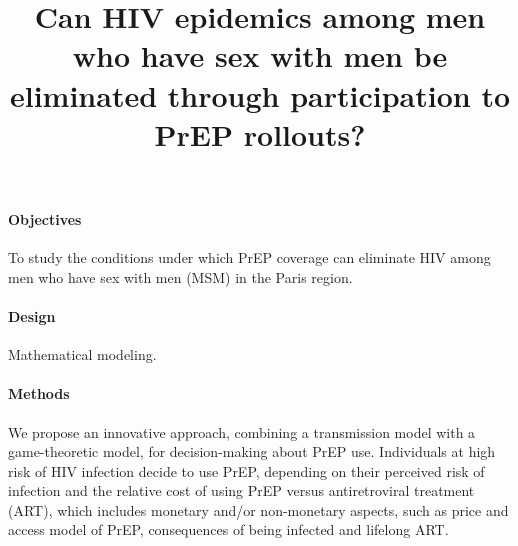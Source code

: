 \documentclass[preprint,review,12pt]{article}			%
\begin{document}

\title{Can HIV epidemics among men who have sex with men be eliminated through participation to PrEP rollouts?}
 
%
%
%
%
%

\maketitle 



\paragraph{Objectives}
To study the conditions under which PrEP coverage can eliminate HIV among men who have sex with men (MSM) in the Paris region. 

\paragraph{Design} 
Mathematical modeling.

\paragraph{Methods}
We propose an innovative approach, combining a transmission model with a game-theoretic model, for decision-making about PrEP use. Individuals at high risk of HIV infection decide to use PrEP, depending on their perceived risk of infection and the relative cost of using PrEP versus antiretroviral treatment (ART), which includes monetary and/or non-monetary aspects, such as price and access model of PrEP, consequences of being infected and lifelong ART. 
\end{document}
